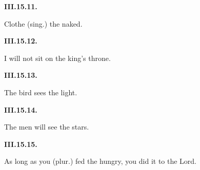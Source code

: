 \par\begin{minipage}{\linewidth}\raggedright
\textbf{III.15.11.}

Clothe (sing.) the naked.

\end{minipage}\par\addvspace{4pt}

\par\begin{minipage}{\linewidth}\raggedright
\textbf{III.15.12.}

I will not sit on the king’s throne.

\end{minipage}\par\addvspace{4pt}

\par\begin{minipage}{\linewidth}\raggedright
\textbf{III.15.13.}

The bird sees the light.

\end{minipage}\par\addvspace{4pt}

\par\begin{minipage}{\linewidth}\raggedright
\textbf{III.15.14.}

The men will see the stars.

\end{minipage}\par\addvspace{4pt}

\par\begin{minipage}{\linewidth}\raggedright
\textbf{III.15.15.}

As long as you (plur.) fed the hungry, you did it to the Lord.

\end{minipage}\par\addvspace{4pt}


